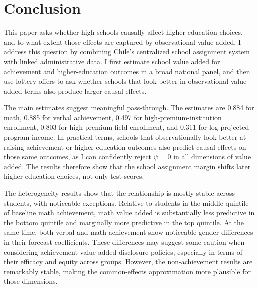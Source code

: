 \documentclass[a4paper, article, english, oneside, unknownkeysallowed, 12pt]{memoir}
\begin{document}
\clearpage 
\section{Conclusion}

This paper asks whether high schools causally affect higher-education choices, and to what extent those effects are captured by observational value added.
I address this question by combining Chile's centralized school assignment system with linked administrative data.
I first estimate school value added for achievement and higher-education outcomes in a broad national panel, and then use lottery offers to ask whether schools that look better in observational value-added terms also produce larger causal effects.

The main estimates suggest meaningful pass-through.
The estimates are 0.884 for math, 0.885 for verbal achievement, 0.497 for high-premium-institution enrollment, 0.803 for high-premium-field enrollment, and 0.311 for log projected program income.
In practical terms, schools that observationally look better at raising achievement or higher-education outcomes also predict causal effects on those same outcomes, as I can confidently reject $\psi = 0$ in all dimensions of value added.
The results therefore show that the school assignment margin shifts later higher-education choices, not only test scores.

The heterogeneity results show that the relationship is mostly stable across students, with noticeable exceptions.
Relative to students in the middle quintile of baseline math achievement, math value added is substantially less predictive in the bottom quintile and marginally more predictive in the top quintile.
At the same time, both verbal and math achievement show noticeable gender differences in their forecast coefficients.
These differences may suggest some caution when considering achievement value-added disclosure policies, especially in terms of their efficacy and equity across groups.
However, the non-achievement results are remarkably stable, making the common-effects approximation more plausible for those dimensions.

\end{document}
